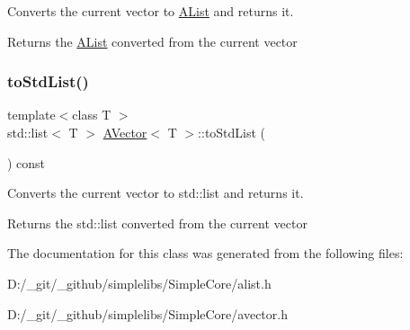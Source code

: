 Converts the current vector to \mbox{\hyperlink{class_a_list}{A\+List}} and returns it. 

\begin{DoxyReturn}{Returns}
the \mbox{\hyperlink{class_a_list}{A\+List}} converted from the current vector 
\end{DoxyReturn}
\mbox{\label{class_a_vector_a1d4f18d5930903cde500ef51266f91c5}} 
\subsubsection{\texorpdfstring{toStdList()}{toStdList()}}
{\footnotesize\ttfamily template$<$class T $>$ \\
std\+::list$<$ T $>$ \mbox{\hyperlink{class_a_vector}{A\+Vector}}$<$ T $>$\+::to\+Std\+List (\begin{DoxyParamCaption}{ }\end{DoxyParamCaption}) const}



Converts the current vector to std\+::list and returns it. 

\begin{DoxyReturn}{Returns}
the std\+::list converted from the current vector 
\end{DoxyReturn}


The documentation for this class was generated from the following files\+:\begin{DoxyCompactItemize}
\item 
D\+:/\+\_\+git/\+\_\+github/simplelibs/\+Simple\+Core/alist.\+h\item 
D\+:/\+\_\+git/\+\_\+github/simplelibs/\+Simple\+Core/avector.\+h\end{DoxyCompactItemize}
